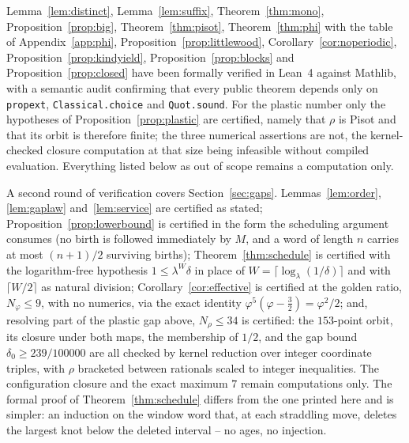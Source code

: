 \documentclass[11pt,reqno]{amsart}
\theoremstyle{plain}
\theoremstyle{definition}
\theoremstyle{remark}
\begin{document}
Lemma~\ref{lem:distinct}, Lemma~\ref{lem:suffix}, Theorem~\ref{thm:mono},
Proposition~\ref{prop:big}, Theorem~\ref{thm:pisot}, Theorem~\ref{thm:phi} with
the table of Appendix~\ref{app:phi}, Proposition~\ref{prop:littlewood},
Corollary~\ref{cor:noperiodic}, Proposition~\ref{prop:kindyield},
Proposition~\ref{prop:blocks} and Proposition~\ref{prop:closed} have been
formally verified in Lean~4 against Mathlib, with a semantic audit confirming
that every public theorem depends only on \texttt{propext},
\texttt{Classical.choice} and \texttt{Quot.sound}. For the plastic number only
the hypotheses of Proposition~\ref{prop:plastic} are certified, namely that
$\rho$ is Pisot and that its orbit is therefore finite; the three numerical
assertions are not, the kernel-checked closure computation at that size being
infeasible without compiled evaluation. Everything listed below as out of scope
remains a computation only.

A second round of verification covers Section~\ref{sec:gaps}.
Lemmas~\ref{lem:order}, \ref{lem:gaplaw} and~\ref{lem:service} are certified as
stated; Proposition~\ref{prop:lowerbound} is certified in the form the
scheduling argument consumes (no birth is followed immediately by $M$, and a
word of length $n$ carries at most $(n+1)/2$ surviving births);
Theorem~\ref{thm:schedule} is certified with the logarithm-free hypothesis
$1\leq\lambda^W\delta$ in place of $W=\lceil\log_\lambda(1/\delta)\rceil$ and
with $\lceil W/2\rceil$ as natural division; Corollary~\ref{cor:effective} is
certified at the golden ratio, $N_\varphi\leq9$, with no numerics, via the
exact identity $\varphi^5(\varphi-\tfrac32)=\varphi^2/2$; and, resolving part
of the plastic gap above, $N_\rho\leq34$ is certified: the $153$-point orbit,
its closure under both maps, the membership of $1/2$, and the gap bound
$\delta_0\geq239/100000$ are all checked by kernel reduction over integer
coordinate triples, with $\rho$ bracketed between rationals scaled to integer
inequalities. The configuration closure and the exact maximum $7$ remain
computations only. The formal proof of Theorem~\ref{thm:schedule} differs from
the one printed here and is simpler: an induction on the window word that, at
each straddling move, deletes the largest knot below the deleted interval --
no ages, no injection.
\end{document}
